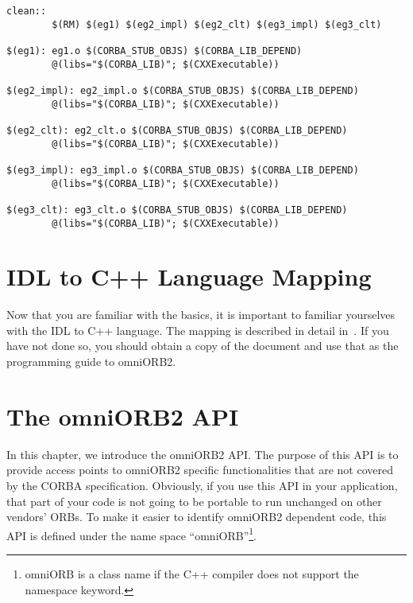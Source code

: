 \documentclass[11pt,twoside,onecolumn]{book}
\begin{document}
{\begin{verbatim}
clean::
        $(RM) $(eg1) $(eg2_impl) $(eg2_clt) $(eg3_impl) $(eg3_clt)

$(eg1): eg1.o $(CORBA_STUB_OBJS) $(CORBA_LIB_DEPEND)
        @(libs="$(CORBA_LIB)"; $(CXXExecutable))

$(eg2_impl): eg2_impl.o $(CORBA_STUB_OBJS) $(CORBA_LIB_DEPEND)
        @(libs="$(CORBA_LIB)"; $(CXXExecutable))

$(eg2_clt): eg2_clt.o $(CORBA_STUB_OBJS) $(CORBA_LIB_DEPEND)
        @(libs="$(CORBA_LIB)"; $(CXXExecutable))

$(eg3_impl): eg3_impl.o $(CORBA_STUB_OBJS) $(CORBA_LIB_DEPEND)
        @(libs="$(CORBA_LIB)"; $(CXXExecutable))

$(eg3_clt): eg3_clt.o $(CORBA_STUB_OBJS) $(CORBA_LIB_DEPEND)
        @(libs="$(CORBA_LIB)"; $(CXXExecutable))

\end{verbatim}
}


\chapter{IDL to C++ Language Mapping}

Now that you are familiar with the basics, it is important to
familiar yourselves with the IDL to C++ language. The mapping is described
in detail in~\cite{corba2-spec}. If you have not done so, you should obtain
a copy of the document and use that as the programming guide to
omniORB2.

%


\chapter{The omniORB2 API}
\label{omniorb2api}

In this chapter, we introduce the omniORB2 API. The purpose
of this API is to provide access points to omniORB2 specific
functionalities that are not covered by the CORBA specification.
Obviously, if you use this API in your application, that part of your code
is not going to be portable to run unchanged on other vendors' ORBs. To
make it easier to identify omniORB2 dependent code, this API is defined
under the name space ``omniORB''\footnote{omniORB is a class name if the
C++ compiler does not support the namespace keyword.}.
\end{document}
